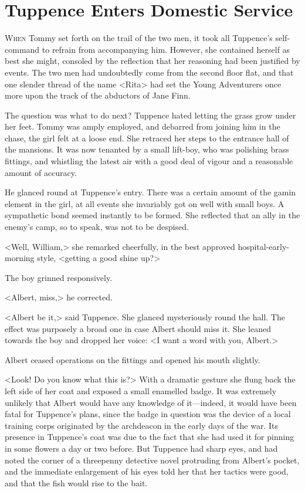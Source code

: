 \chapter{Tuppence Enters Domestic Service} 

 \lettrine{W}{hen} Tommy set forth on the trail of the two men, it took all Tuppence's self-command to refrain from accompanying him. However, she contained herself as best she might, consoled by the reflection that her reasoning had been justified by events. The two men had undoubtedly come from the second floor flat, and that one slender thread of the name <Rita> had set the Young Adventurers once more upon the track of the abductors of Jane Finn.

The question was what to do next? Tuppence hated letting the grass grow under her feet. Tommy was amply employed, and debarred from joining him in the chase, the girl felt at a loose end. She retraced her steps to the entrance hall of the mansions. It was now tenanted by a small lift-boy, who was polishing brass fittings, and whistling the latest air with a good deal of vigour and a reasonable amount of accuracy.

He glanced round at Tuppence's entry. There was a certain amount of the gamin element in the girl, at all events she invariably got on well with small boys. A sympathetic bond seemed instantly to be formed. She reflected that an ally in the enemy's camp, so to speak, was not to be despised.

<Well, William,> she remarked cheerfully, in the best approved hospital-early-morning style, <getting a good shine up?>

The boy grinned responsively.

<Albert, miss,> he corrected.

<Albert be it,> said Tuppence. She glanced mysteriously round the hall. The effect was purposely a broad one in case Albert should miss it. She leaned towards the boy and dropped her voice: <I want a word with you, Albert.>

Albert ceased operations on the fittings and opened his mouth slightly.

<Look! Do you know what this is?> With a dramatic gesture she flung back the left side of her coat and exposed a small enamelled badge. It was extremely unlikely that Albert would have any knowledge of it—indeed, it would have been fatal for Tuppence's plans, since the badge in question was the device of a local training corps originated by the archdeacon in the early days of the war. Its presence in Tuppence's coat was due to the fact that she had used it for pinning in some flowers a day or two before. But Tuppence had sharp eyes, and had noted the corner of a threepenny detective novel protruding from Albert's pocket, and the immediate enlargement of his eyes told her that her tactics were good, and that the fish would rise to the bait.

